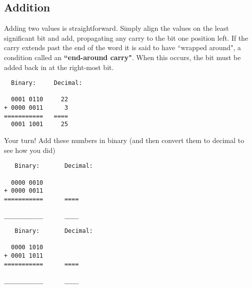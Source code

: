 
\bigskip

\subsection*{Addition}

Adding two values is straightforward. Simply align the values on the least significant bit and add, propagating any carry to the bit one position left. If the carry extends past the end of the word it is said to have ``wrapped around", a condition called an \textbf{``end-around carry"}. When this occurs, the bit must be added back in at the right-most bit. %

\begin{verbatim}
  Binary:     Decimal:
   
  0001 0110     22
+ 0000 0011      3
===========   ====
  0001 1001     25
\end{verbatim}


\bigskip

\noindent Your turn! Add these numbers in binary (and then convert them to decimal to see how you did)
\begin{verbatim}
   Binary:       Decimal:

  0000 0010      
+ 0000 0011      
===========      ====

___________      ____
\end{verbatim}

\bigskip


\begin{verbatim}
   Binary:       Decimal:

  0000 1010      
+ 0001 1011      
===========      ====

___________      ____
\end{verbatim}



